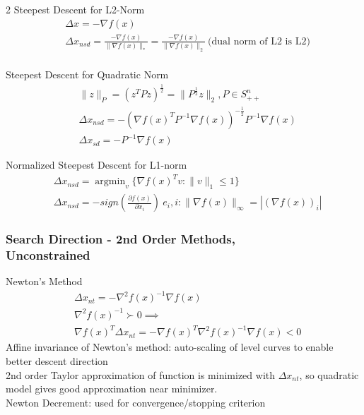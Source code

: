 \documentclass[8pt]{extarticle}
\DeclareMathOperator*{\argmin}{argmin}
\newcommand{\norm}[1]{\|#1\|}
\newcommand{\set}[1]{\{#1\}}
\begin{document}
\begin{multicols*}{2}
  Steepest Descent for L2-Norm
  \begin{align*}
    &\Delta x = -\nabla f(x)\\
    &\Delta x_{nsd} = \frac{-\nabla f(x)}{\norm{\nabla f(x)}_*} = \frac{-\nabla f(x)}{\norm{\nabla f(x)}_2}\ \text{(dual norm of L2 is L2)}\\
  \end{align*}
  
  Steepest Descent for Quadratic Norm
  \begin{align*}
    &\norm{z}_P = (z^TPz)^{\frac{1}{2}} = \norm{P^{\frac{1}{2}}z}_2, P \in S_{++}^n\\
    &\Delta x_{nsd} = -(\nabla f(x)^T P^{-1} \nabla f(x))^{-\frac{1}{2}} P^{-1} \nabla f(x)\\
    &\Delta x_{sd} = -P^{-1} \nabla f(x)
  \end{align*}

  Normalized Steepest Descent for L1-norm
  \begin{align*}
    &\Delta x_{nsd} = \argmin_{v} \set{ \nabla f(x)^T v : \norm{v}_1 \leq 1 }\\
    &\Delta x_{nsd} = - sign (\frac{\partial f(x)}{\partial x_i})\ e_i, i: \norm{\nabla f(x)}_{\infty} = |(\nabla f(x))_i|
  \end{align*}
  \vfill\null  
  \pagebreak
  
  \subsubsection{Search Direction - 2nd Order Methods,\\ Unconstrained}
  Newton's Method
  \begin{align*}
    &\Delta x_{nt} = - \nabla^2 f(x)^{-1} \nabla f(x)\\
    &\nabla^2 f(x)^{-1} \succ 0 \implies\\
    &\nabla f(x)^T \Delta x_{nt} = - \nabla f(x)^T \nabla^2 f(x)^{-1} \nabla f(x) < 0
  \end{align*}
  Affine invariance of Newton's method: auto-scaling of level curves to enable better descent direction\\
  
  2nd order Taylor approximation of function is minimized with $\Delta x_{nt}$, so quadratic model gives good approximation near minimizer.\\

  Newton Decrement: used for convergence/stopping criterion
  

\end{multicols*}
\end{document}
